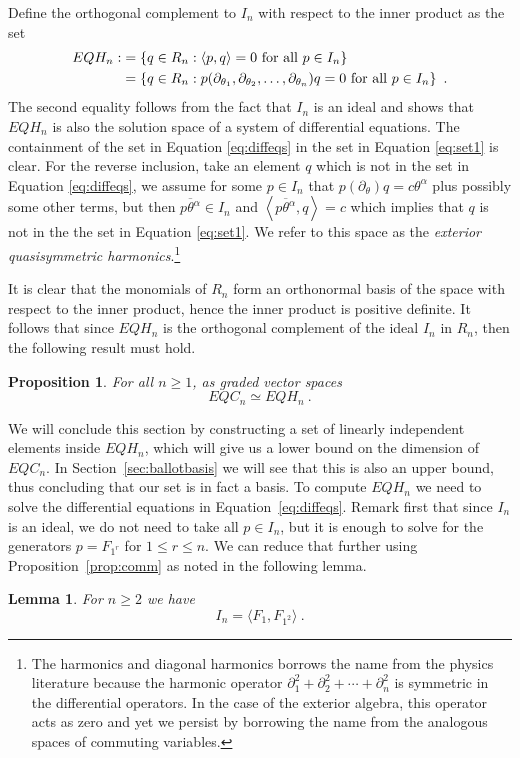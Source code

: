 \documentclass[11pt,oneside]{amsart}
\newtheorem{prop}[theorem]{Proposition}
\newtheorem{lemma}[theorem]{Lemma}
\theoremstyle{definition}
\numberwithin{equation}{section}
\newcommand{\mike}[1]{\todo[size=\tiny,color=lime!30]{#1 \\ \hfill --- Mike}}
\begin{document}
Define the orthogonal complement to $I_n$ with respect to the inner product as
the set
\begin{align}
EQH_n :&= \left\{ q \in R_n : \left< p, q \right> = 0 \hbox{ for all } p \in I_n \right\}
\label{eq:set1}\\
  &=\left\{ q \in R_n : p(\partial_{\theta_1}, \partial_{\theta_2}, \ldots, \partial_{\theta_n})
q= 0 \hbox{ for all } p \in I_n \right\}~.\label{eq:diffeqs}
\end{align}
The second equality follows from the fact that $I_n$ is an ideal
and shows that $EQH_n$ is also the solution space of
a system of differential equations.  The containment of the set
in Equation \eqref{eq:diffeqs} in the set in Equation \eqref{eq:set1} is clear.
For the reverse inclusion, take an element $q$ which is not in the
set in Equation \eqref{eq:diffeqs}, we assume
for some $p \in I_n$ that $p(\partial_\theta) q = c \theta^\alpha$ plus possibly some other terms,
but then $\overline{p \theta^\alpha} \in I_n$
and $\left< \overline{p \theta^\alpha}, q \right> = c$ which implies that $q$ is not in the
the set in Equation \eqref{eq:set1}.
We refer to this space as the \emph{exterior quasisymmetric harmonics}.\footnote{
The harmonics and diagonal harmonics borrows the name from the physics literature
because the harmonic operator $\partial_1^2 + \partial_2^2 + \cdots + \partial_n^2$
is symmetric in the differential operators.  In the case of the exterior algebra,
this operator acts as zero and yet we persist by borrowing the name from the
analogous spaces of commuting variables.
}

It is clear that the monomials of $R_n$ form an orthonormal basis of the space
with respect to the inner product, hence the inner product is positive definite.
It follows that since $EQH_n$ is the orthogonal complement of the ideal $I_n$ in $R_n$,
then the following result must hold.
\begin{prop} For all $n \geq 1$, as graded vector spaces
\[
EQC_n \simeq EQH_n~.
\]
\end{prop}

We will conclude this section  by constructing a set of linearly independent elements inside $EQH_n$, which will
give us a lower  bound on the dimension of $EQC_n$. In Section~\ref{sec:ballotbasis} we will see that this is also an upper bound,
thus concluding that our  set is in fact a basis. To compute $EQH_n$ we need to solve the differential equations in Equation~\eqref{eq:diffeqs}.
Remark first  that since $I_n$ is an ideal, we do not need to take all $p\in I_n$, but it is enough to solve for the generators $p=F_{1^r}$ for  $1\le r\le n$.
We can reduce that further using Proposition~\ref{prop:comm} as noted in the following lemma.
\begin{lemma}\label{lem:idealgen}
For $n\ge 2$ we have
\[
I_n=\langle F_1, F_{1^2}  \rangle~.
\]
\end{lemma}
\end{document}
